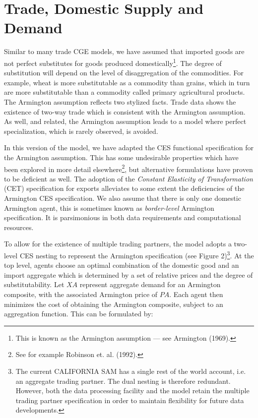 \documentclass[12pt]{article}
\begin{document}
\section{Trade, Domestic Supply and Demand}

Similar to many trade CGE models, we have assumed that imported goods are not perfect substitutes for goods produced domestically\footnote{This is known as the Armington assumption — see Armington (1969).}. The degree of substitution will depend on the level of disaggregation of the commodities. For example, wheat is more substitutable as a commodity than grains, which in turn are more substitutable than a commodity called primary agricultural products. The Armington assumption reflects two stylized facts. Trade data shows the existence of two-way trade which is consistent with the Armington assumption. As well, and related, the Armington assumption leads to a model where perfect specialization, which is rarely observed, is avoided.

In this version of the model, we have adapted the CES functional specification for the Armington assumption. This has some undesirable properties which have been explored in more detail elsewhere\footnote{See for example Robinson et. al. (1992).}, but alternative formulations have proven to be deficient as well. The adoption of the \textit{Constant Elasticity of Transformation} (CET) specification for exports alleviates to some extent the deficiencies of the Armington CES specification. We also assume that there is only one domestic Armington agent, this is sometimes known as \textit{border-level} Armington specification. It is parsimonious in both data requirements and computational resources.

To allow for the existence of multiple trading partners, the model adopts a two-level CES nesting to represent the Armington specification (see Figure 2)\footnote{The current CALIFORNIA SAM has a single rest of the world account, i.e. an aggregate trading partner. The dual nesting is therefore redundant. However, both the data processing facility and the model retain the multiple trading partner specification in order to maintain flexibility for future data developments.}. At the top level, agents choose an optimal combination of the domestic good and an import aggregate which is determined by a set of relative prices and the degree of substitutability. Let $XA$ represent aggregate demand for an Armington composite, with the associated Armington price of $PA$. Each agent then minimizes the cost of obtaining the Armington composite, subject to an aggregation function. This can be formulated by:
\end{document}
